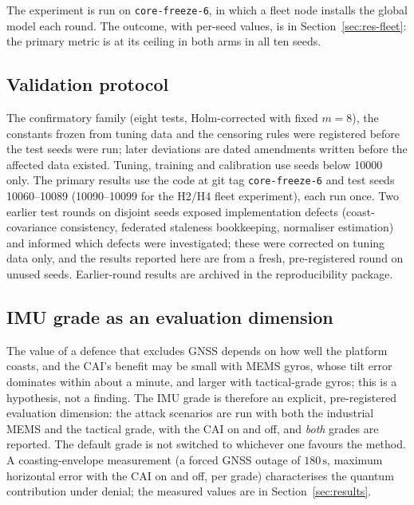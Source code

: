 \documentclass[journal]{IEEEtran}
\begin{document}
The experiment is run on \texttt{core-freeze-6}, in which a fleet node installs the global model each round. The outcome, with per-seed values, is in Section~\ref{sec:res-fleet}: the primary metric is at its ceiling in both arms in all ten seeds.

\subsection{Validation protocol}
\label{sec:campaign}
The confirmatory family (eight tests, Holm-corrected with fixed $m=8$), the constants frozen from tuning data and the censoring rules were
registered before the test seeds were run; later deviations are dated amendments written before the affected data existed. Tuning, training and
calibration use seeds below 10000 only. The primary results use the code at git tag \texttt{core-freeze-6} and test seeds 10060--10089
(10090--10099 for the H2/H4 fleet experiment), each run once. Two earlier test rounds on disjoint seeds exposed implementation defects
(coast-covariance consistency, federated staleness bookkeeping, normaliser estimation) and informed which defects were investigated; these were corrected on tuning data only, and the
results reported here are from a fresh, pre-registered round on unused seeds. Earlier-round results are archived in the reproducibility package.

\subsection{IMU grade as an evaluation dimension}
\label{sec:grade}
The value of a defence that excludes GNSS depends on how well the platform coasts, and the CAI's benefit may be
small with MEMS gyros, whose tilt error dominates within about a minute, and larger with
tactical-grade gyros; this is a hypothesis, not a finding. The IMU grade is therefore an explicit, pre-registered evaluation dimension: the
attack scenarios are run with both the industrial MEMS and the tactical grade, with the CAI on and off, and
\emph{both} grades are reported. The default grade is not switched to whichever one favours the method.
A coasting-envelope measurement (a forced GNSS outage of $180\,\mathrm{s}$, maximum horizontal error with the CAI
on and off, per grade) characterises the quantum contribution under denial; the measured values are in Section~\ref{sec:results}.
\end{document}
